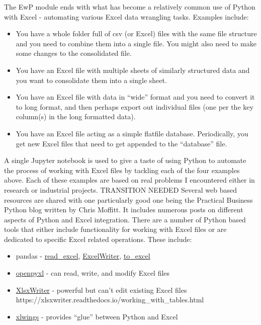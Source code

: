 \documentclass[ited,blindrev]{informs3}              %
\begin{document}
The EwP module ends with what has become a relatively common use of Python with Excel - automating various Excel data wrangling tasks. Examples include:

\begin{itemize}
	\tightlist
	\item
	You have a whole folder full of csv (or Excel) files with the same
	file structure and you need to combine them into a single file. You
	might also need to make some changes to the consolidated file.
	\item
	You have an Excel file with multiple sheets of similarly structured
	data and you want to consolidate them into a single sheet.
	\item
	You have an Excel file with data in ``wide'' format and you need to
	convert it to long format, and then perhaps export out individual
	files (one per the key column(s) in the long formatted data).
	\item
	You have an Excel file acting as a simple flatfile database.
	Periodically, you get new Excel files that need to get appended to the
	``database'' file.
\end{itemize}

A single Jupyter notebook is used to give a taste of using Python to automate the process of working with Excel files by tackling each of the four examples above. Each of these examples are based on real problems I encountered either in research or industrial projects. TRANSITION NEEDED Several web based resources are shared with one particularly good one being the Practical Business Python blog written by Chris Moffitt. It includes numerous posts on different aspects of Python and Excel integration. There are a number of Python based tools that either include functionality for working with Excel files or are dedicated to specific Excel related operations. These include:

\begin{itemize}
	\tightlist
	\item
	pandas -
	\href{https://pandas.pydata.org/docs/reference/api/pandas.read_excel.html}{read\_excel},
	\href{https://pandas.pydata.org/docs/reference/api/pandas.ExcelWriter.html}{ExcelWriter},
	\href{https://pandas.pydata.org/docs/reference/api/pandas.DataFrame.to_excel.html}{to\_excel}
	\item
	\href{https://openpyxl.readthedocs.io/en/stable/}{openpyxl} - can
	read, write, and modify Excel files
	\item
	\href{https://xlsxwriter.readthedocs.io/}{XlsxWriter} - powerful but
	can't edit existing Excel files
	https://xlsxwriter.readthedocs.io/working\_with\_tables.html
	\item
	\href{https://www.xlwings.org/}{xlwings} - provides ``glue'' between
	Python and Excel
\end{itemize}
\end{document}
